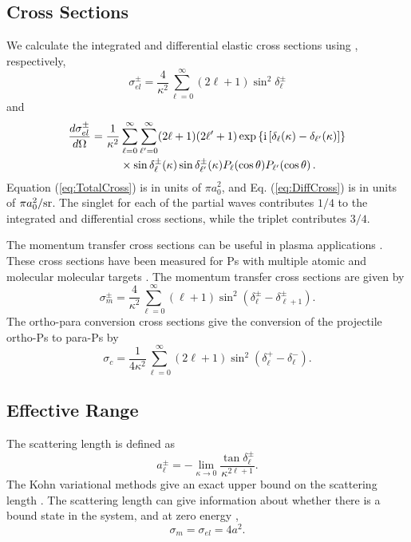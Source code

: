 \documentclass[preprint,showpacs,preprintnumbers,amsmath,amssymb,longbibliography,pra,aps]{revtex4-1}
\newcommand{\ii}{{\rm{i}}}
\begin{document}
\subsection{Cross Sections}
We calculate the integrated and differential elastic cross sections using \cite{Bransden2003}, respectively,
\begin{equation}
\label{eq:TotalCross}
\sigma_{el}^\pm = \frac{4}{\kappa^2} \sum_{\ell=0}^\infty (2\ell+1) \sin^2 \delta_\ell^\pm
\end{equation}
and
\begin{align}
\label{eq:DiffCross}
\nonumber \frac{d\sigma_{el}^\pm}{d\Omega} = \frac{1}{\kappa^2} & \sum_{\ell=0}^\infty \sum_{\ell^\prime=0}^\infty (2\ell+1)(2\ell^\prime+1) \exp\left\{\ii \left[\delta_\ell(\kappa) - \delta_{\ell^\prime}(\kappa) \right] \right\} \\
& \times \sin\delta_\ell^\pm(\kappa) \sin\delta_{\ell^\prime}^\pm(\kappa) P_\ell(\cos\theta) P_{\ell^\prime}(\cos\theta)\,.
\end{align}
Equation (\ref{eq:TotalCross}) is in units of $\pi a_0^2$, and Eq. (\ref{eq:DiffCross}) is in units of $\pi a_0^2 / \rm{sr}$. The singlet for each of the partial waves contributes $1/4$ to the integrated and differential cross sections, while the triplet contributes $3/4$.

The momentum transfer cross sections can be useful in plasma applications \cite{Wang2014, McEachran2014}. These cross sections have been measured for Ps with multiple atomic and molecular molecular targets \cite{Nagashima1998,Saito2003}. The momentum transfer cross sections are given by \cite{Bransden2003}
\begin{equation}
\label{eq:MomentumCross}
\sigma_{m}^\pm = \frac{4}{\kappa^2} \sum_{\ell=0}^\infty (\ell+1) \sin^2 (\delta_\ell^\pm - \delta_{\ell+1}^\pm) .
\end{equation}
The ortho-para conversion cross sections give the conversion of the projectile ortho-Ps to para-Ps by \cite{Hara1975}
\begin{equation}
\label{eq:OrthoParaCross}
\sigma_{c} = \frac{1}{4 \kappa^2} \sum_{\ell=0}^\infty (2 \ell+1) \sin^2 (\delta_\ell^+ - \delta_\ell^-).
\end{equation}


\subsection{Effective Range}

The scattering length is defined as \cite{Bransden2003}
\begin{equation}
\label{eq:ScatLen}
a_\ell^\pm = -\lim_{\kappa \to 0} \frac{\tan{\delta_\ell^\pm}}{\kappa^{2\ell+1}}.
\end{equation}
The Kohn variational methods give an exact upper bound on the scattering length \cite{Joachain1979}. The scattering length can give information about whether there is a bound state in the system, and at zero energy \cite{Buckman1989},
\begin{equation}
\label{eq:ScatLenCross}
\sigma_m = \sigma_{el} = 4 a^2 .
\end{equation}
\end{document}
